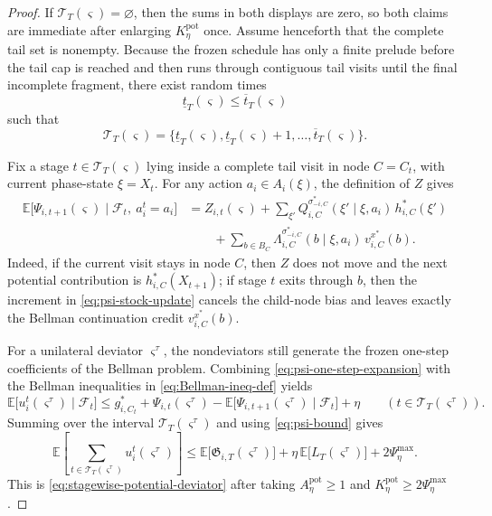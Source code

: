 \documentclass[12pt]{article}
\theoremstyle{definition}
\newcommand{\E}{\mathbb{E}}
\newcommand{\1}{\mathbf{1}}
\newcommand{\cF}{\mathcal{F}}
\begin{document}
\begin{proof}
If $\mathcal T_T(\varsigma)=\varnothing$, then the sums in both displays are zero,
so both claims are immediate after enlarging $K_\eta^{\mathrm{pot}}$ once.
Assume henceforth that the complete tail set is nonempty. Because the frozen
schedule has only a finite prelude before the tail cap is reached and then runs
through contiguous tail visits until the final incomplete fragment, there exist
random times
\[
\underline t_T(\varsigma)\le \overline t_T(\varsigma)
\]
such that
\[
\mathcal T_T(\varsigma)
=
\{\underline t_T(\varsigma),\underline t_T(\varsigma)+1,\dots,
\overline t_T(\varsigma)\}.
\]

Fix a stage $t\in\mathcal T_T(\varsigma)$ lying inside a complete tail visit in
node $C=C_t$, with current phase-state $\xi=X_t$. For any action $a_i\in A_i(\xi)$,
the definition of $Z$ gives
\begin{align}
\label{eq:psi-one-step-expansion}
\E\bigl[\Psi_{i,t+1}(\varsigma)\mid \cF_t,\ a_i^t=a_i\bigr]
&=
Z_{i,t}(\varsigma)
+
\sum_{\xi'}Q_{i,C}^{\sigma_{-i,C}^*}(\xi'\mid\xi,a_i)\,h_{i,C}^*(\xi')
\nonumber\\
&\qquad
+
\sum_{b\in B_C}\Lambda_{i,C}^{\sigma_{-i,C}^*}(b\mid\xi,a_i)\,
v_{i,C}^{x^*}(b).
\end{align}
Indeed, if the current visit stays in node $C$, then $Z$ does not move and the
next potential contribution is $h_{i,C}^*(X_{t+1})$; if stage $t$ exits through
$b$, then the increment in \eqref{eq:psi-stock-update} cancels the child-node
bias and leaves exactly the Bellman continuation credit $v_{i,C}^{x^*}(b)$.

For a unilateral deviator $\varsigma^\tau$, the nondeviators still generate the
frozen one-step coefficients of the Bellman problem. Combining
\eqref{eq:psi-one-step-expansion} with the Bellman inequalities in
\eqref{eq:Bellman-ineq-def} yields
\[
\E\bigl[u_i^t(\varsigma^\tau)\mid \cF_t\bigr]
\le
g_{i,C_t}^*
+
\Psi_{i,t}(\varsigma^\tau)
-
\E\bigl[\Psi_{i,t+1}(\varsigma^\tau)\mid \cF_t\bigr]
+\eta
\qquad (t\in\mathcal T_T(\varsigma^\tau)).
\]
Summing over the interval $\mathcal T_T(\varsigma^\tau)$ and using
\eqref{eq:psi-bound} gives
\[
\E\left[
\sum_{t\in\mathcal T_T(\varsigma^\tau)}
u_i^t(\varsigma^\tau)
\right]
\le
\E\bigl[\mathfrak G_{i,T}(\varsigma^\tau)\bigr]
+
\eta\,\E\bigl[L_T(\varsigma^\tau)\bigr]
+
2\Psi_\eta^{\max}.
\]
This is \eqref{eq:stagewise-potential-deviator} after taking
$A_\eta^{\mathrm{pot}}\ge 1$ and $K_\eta^{\mathrm{pot}}\ge 2\Psi_\eta^{\max}$.


\end{proof}
\end{document}
